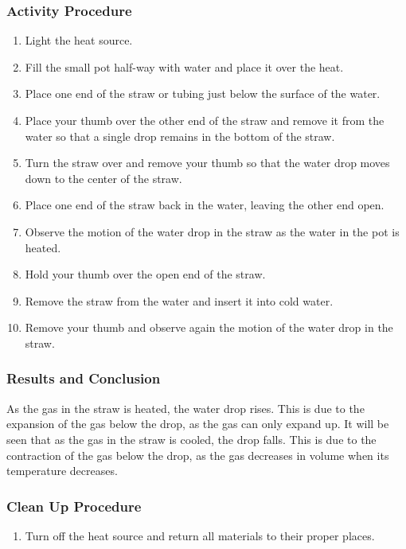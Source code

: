 \subsubsection*{Activity Procedure}
\begin{enumerate}
\item{Light the heat source.} 
\item{Fill the small pot half-way with water and place it over the heat.} 
\item{Place one end of the straw or tubing just below the surface of the water.} 
\item{Place your thumb over the other end of the straw and remove it from the water so that a single drop remains in the bottom of the straw.} 
\item{Turn the straw over and remove your thumb so that the water drop moves down to the center of the straw.} 
\item{Place one end of the straw back in the water, leaving the other end open.} 
\item{Observe the motion of the water drop in the straw as the water in the pot is heated.} 
\item{Hold your thumb over the open end of the straw.} 
\item{Remove the straw from the water and insert it into cold water.} 
\item{Remove your thumb and observe again the motion of the water drop in the straw.} 
\end{enumerate}

\subsubsection*{Results and Conclusion}
As the gas in the straw is heated, the water drop rises. This is due to the expansion of the gas below the drop, as the gas can only expand up. It will be seen that as the gas in the straw is cooled, the drop falls. This is due to the contraction of the gas below the drop, as the gas decreases in volume when its temperature decreases.  

\subsubsection*{Clean Up Procedure}
\begin{enumerate}
\item{Turn off the heat source and return all materials to their proper places.} 
\end{enumerate}

